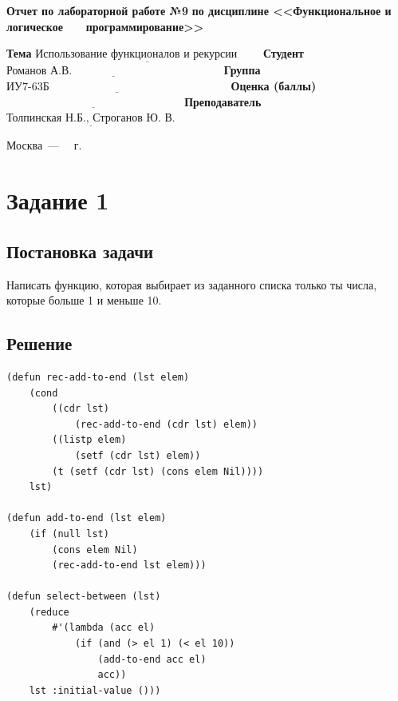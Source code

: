 \documentclass[12pt]{report}
\begin{document}
\begin{titlepage}
		\begin{center}
			\noindent\begin{minipage}{1.1\textwidth}\centering
				\Large\textbf{  Отчет по лабораторной работе №9}\newline
				\textbf{по дисциплине <<Функциональное и логическое}\newline
				\textbf{~~~программирование>>}\newline\newline
			\end{minipage}
		\end{center}
		
		\noindent\textbf{Тема} $\underline{\text{Использование функционалов и рекурсии~~~~~~}}$\newline\newline
		\noindent\textbf{Студент} $\underline{\text{Романов А.В.~~~~~~~~~~~~~~~~~~~~~~~~~~~~~~~~~~~~~~~~}}$\newline\newline
		\noindent\textbf{Группа} $\underline{\text{ИУ7-63Б~~~~~~~~~~~~~~~~~~~~~~~~~~~~~~~~~~~~~~~~~~~~~~~~}}$\newline\newline
		\noindent\textbf{Оценка (баллы)} $\underline{\text{~~~~~~~~~~~~~~~~~~~~~~~~~~~~~~~~~~~~~~~~~~~~~~~}}$\newline\newline
		\noindent\textbf{Преподаватель} $\underline{\text{Толпинская Н.Б., Строганов Ю. В.}}$\newline\newline\newline
		
		\begin{center}
			\vfill
			Москва~---~\the\year
			~г.
		\end{center}
	\end{titlepage}
	
	
\section*{Задание 1}
\subsection*{Постановка задачи}
Написать функцию, которая выбирает из заданного списка только ты числа, которые больше 1 и меньше 10.

\subsection*{Решение}
\begin{lstlisting}
(defun rec-add-to-end (lst elem)
	(cond 
		((cdr lst)
			(rec-add-to-end (cdr lst) elem))
		((listp elem)
			(setf (cdr lst) elem))
		(t (setf (cdr lst) (cons elem Nil))))
	lst)

(defun add-to-end (lst elem)
	(if (null lst)
		(cons elem Nil)
		(rec-add-to-end lst elem)))

(defun select-between (lst)
	(reduce
		#'(lambda (acc el)
			(if (and (> el 1) (< el 10))
				(add-to-end acc el)
				acc))
	lst :initial-value ()))
\end{lstlisting}
\end{document}
